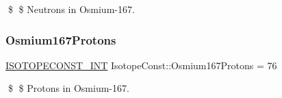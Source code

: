 \$ \$ Neutrons in Osmium-\/167. \mbox{\label{group___isotope_const-_osmium-_os167_ga0791f5443c1f17dc150a84d8f81a7300}} 
\subsubsection{\texorpdfstring{Osmium167\+Protons}{Osmium167Protons}}
{\footnotesize\ttfamily \mbox{\hyperlink{group___isotope_const-_macros_ga5f18360b3e99483a35c32d789e62621c}{I\+S\+O\+T\+O\+P\+E\+C\+O\+N\+S\+T\+\_\+\+I\+NT}} Isotope\+Const\+::\+Osmium167\+Protons = 76}

\$ \$ Protons in Osmium-\/167. 